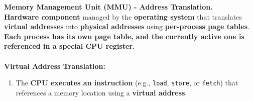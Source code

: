 \documentclass[8pt]{extarticle}
\begin{document}
\begin{minipage}[htp]{0.5\textwidth}
\begin{minipage}[htp]{1\textwidth}
\noindent\textbf{Memory Management Unit (MMU) - Address Translation.}  \\
\textbf{Hardware component} managed by the \textbf{operating system} that translates \textbf{virtual addresses} into \textbf{physical addresses} using \textbf{per-process page tables}. \textbf{Each process has its own page table, and the currently active one is referenced in a special CPU register.} \\
\\[2px]
    \noindent\textbf{Virtual Address Translation:}
    \begin{enumerate}[noitemsep,nolistsep,topsep=-10px,partopsep=0pt,parsep=0pt]
        \item The \textbf{CPU executes an instruction} (e.g., \texttt{load}, \texttt{store}, or \texttt{fetch}) that references a memory location using a \textbf{virtual address}.

\end{enumerate}
\end{minipage}
\end{minipage}
\end{document}
